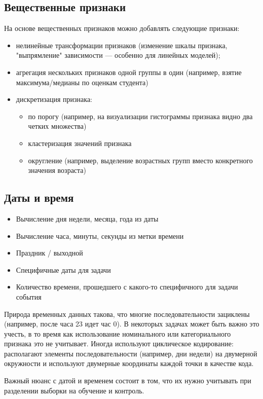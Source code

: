 \documentclass[12pt,a4paper]{article}
\begin{document}
	 \subsection{Вещественные признаки}
	 На основе вещественных признаков можно добавлять следующие признаки:
	 \begin{itemize}
	 	\item нелинейные трансформации признаков (изменение шкалы признака, "выпрямление" зависимости --- особенно для линейных моделей);
	 	\item агрегация нескольких признаков одной группы в один (например, взятие максимума/медианы по оценкам студента)
	 	\item дискретизация признака:
	 	\begin{itemize}
	 		\item по порогу (например, на визуализации гистограммы признака видно два четких множества)
	 		\item кластеризация значений признака
	 		\item округление (например, выделение возрастных групп вместо конкретного значения возраста)
	 	\end{itemize}
	 \end{itemize}
 
    \subsection{Даты и время}
    \begin{itemize}
    	\item Вычисление дня недели, месяца, года из даты
    	\item Вычисление часа, минуты, секунды из метки времени
    	\item Праздник / выходной
    	\item Специфичные даты для задачи
    	\item Количество времени, прошедшего с какого-то специфичного для задачи события
    \end{itemize}
    Природа временных данных такова, что многие последовательности зациклены (например, после часа 23 идет час 0). В некоторых задачах может быть важно это учесть, в то время как использование номинального или категориального признака это не учитывает. Иногда используют циклическое кодирование: располагают элементы последовательности (например, дни недели) на двумерной окружности и используют двумерные координаты каждой точки в качестве кода.
    
    Важный нюанс с датой и временем состоит в том, что их нужно учитывать при разделении выборки на обучение и контроль.
    
\end{document}
